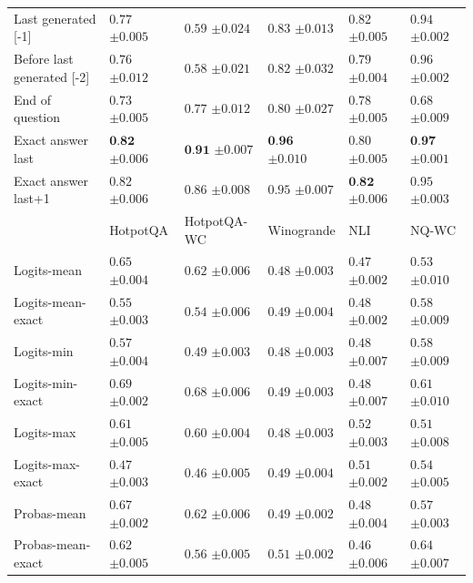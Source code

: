 \begin{table}[t]
{\begin{tabular}{l|lllll}
Last generated [-1] & $0.77$ \tiny$\pm 0.005$ & $0.59$ \tiny$\pm 0.024$ & $0.83$ \tiny$\pm 0.013$ & $0.82$ \tiny$\pm 0.005$ & $0.94$ \tiny$\pm 0.002$ \\
Before last generated [-2] & $0.76$ \tiny$\pm 0.012$ & $0.58$ \tiny$\pm 0.021$ & $0.82$ \tiny$\pm 0.032$ & $0.79$ \tiny$\pm 0.004$ & $0.96$ \tiny$\pm 0.002$ \\
End of question & $0.73$ \tiny$\pm 0.005$ & $0.77$ \tiny$\pm 0.012$ & $0.80$ \tiny$\pm 0.027$ & $0.78$ \tiny$\pm 0.005$ & $0.68$ \tiny$\pm 0.009$ \\
\midrule
Exact answer last & $\textbf{0.82}$ \tiny$\pm 0.006$ & $\textbf{0.91}$ \tiny$\pm 0.007$ & $\textbf{0.96}$ \tiny$\pm 0.010$ & $0.80$ \tiny$\pm 0.005$ & $\textbf{0.97}$ \tiny$\pm 0.001$ \\
Exact answer last+1 & $0.82$ \tiny$\pm 0.006$ & $0.86$ \tiny$\pm 0.008$ & $0.95$ \tiny$\pm 0.007$ & $\textbf{0.82}$ \tiny$\pm 0.006$ & $0.95$ \tiny$\pm 0.003$ \\
     \midrule
    & HotpotQA & HotpotQA-WC & Winogrande & NLI & NQ-WC \\
     \midrule
    Logits-mean & $0.65$ \tiny$\pm 0.004$ & $0.62$ \tiny$\pm 0.006$ & $0.48$ \tiny$\pm 0.003$ & $0.47$ \tiny$\pm 0.002$ & $0.53$ \tiny$\pm 0.010$ \\
Logits-mean-exact & $0.55$ \tiny$\pm 0.003$ & $0.54$ \tiny$\pm 0.006$ & $0.49$ \tiny$\pm 0.004$ & $0.48$ \tiny$\pm 0.002$ & $0.58$ \tiny$\pm 0.009$ \\
Logits-min & $0.57$ \tiny$\pm 0.004$ & $0.49$ \tiny$\pm 0.003$ & $0.48$ \tiny$\pm 0.003$ & $0.48$ \tiny$\pm 0.007$ & $0.58$ \tiny$\pm 0.009$ \\
Logits-min-exact & $0.69$ \tiny$\pm 0.002$ & $0.68$ \tiny$\pm 0.006$ & $0.49$ \tiny$\pm 0.003$ & $0.48$ \tiny$\pm 0.007$ & $0.61$ \tiny$\pm 0.010$ \\
Logits-max & $0.61$ \tiny$\pm 0.005$ & $0.60$ \tiny$\pm 0.004$ & $0.48$ \tiny$\pm 0.003$ & $0.52$ \tiny$\pm 0.003$ & $0.51$ \tiny$\pm 0.008$ \\
Logits-max-exact & $0.47$ \tiny$\pm 0.003$ & $0.46$ \tiny$\pm 0.005$ & $0.49$ \tiny$\pm 0.004$ & $0.51$ \tiny$\pm 0.002$ & $0.54$ \tiny$\pm 0.005$ \\
Probas-mean & $0.67$ \tiny$\pm 0.002$ & $0.62$ \tiny$\pm 0.006$ & $0.49$ \tiny$\pm 0.002$ & $0.48$ \tiny$\pm 0.004$ & $0.57$ \tiny$\pm 0.003$ \\
Probas-mean-exact & $0.62$ \tiny$\pm 0.005$ & $0.56$ \tiny$\pm 0.005$ & $0.51$ \tiny$\pm 0.002$ & $0.46$ \tiny$\pm 0.006$ & $0.64$ \tiny$\pm 0.007$ \\

\end{tabular}}
\end{table}
